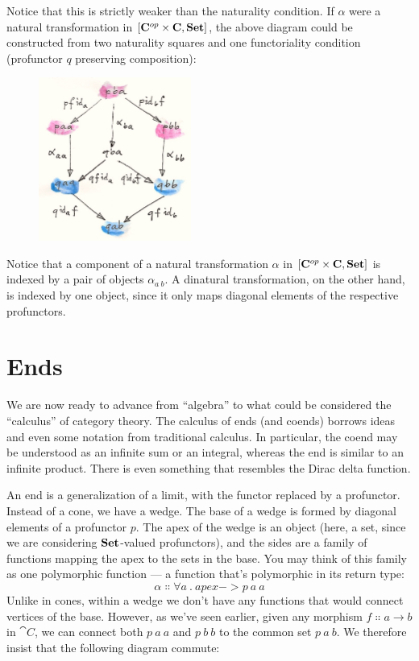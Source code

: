 \noindent
Notice that this is strictly weaker than the naturality condition. If
$\alpha$ were a natural transformation in
${[}\mathbf{C}^{op}\times{}\mathbf{C}, \mathbf{Set}{]}$, the above diagram could be constructed
from two naturality squares and one functoriality condition (profunctor
$q$ preserving composition):

\begin{figure}[H]
\centering
\includegraphics[width=50mm]{images/end-1.jpg}
\end{figure}

\noindent
Notice that a component of a natural transformation $\alpha$ in
${[}\mathbf{C}^{op}\times{}\mathbf{C}, \mathbf{Set}{]}$ is indexed by a pair of objects
$\alpha_{a\ b}$. A dinatural transformation, on the other hand, is
indexed by one object, since it only maps diagonal elements of the
respective profunctors.

\section{Ends}

We are now ready to advance from ``algebra'' to what could be considered
the ``calculus'' of category theory. The calculus of ends (and coends)
borrows ideas and even some notation from traditional calculus. In
particular, the coend may be understood as an infinite sum or an
integral, whereas the end is similar to an infinite product. There is
even something that resembles the Dirac delta function.

An end is a generalization of a limit, with the functor replaced by a
profunctor. Instead of a cone, we have a wedge. The base of a wedge is
formed by diagonal elements of a profunctor $p$. The apex of the
wedge is an object (here, a set, since we are considering
$\mathbf{Set}$-valued profunctors), and the sides are a family of
functions mapping the apex to the sets in the base. You may think of
this family as one polymorphic function --- a function that's
polymorphic in its return type:
\[\alpha \Colon \forall a\ .\ apex -> p\ a\ a\]
Unlike in cones, within a wedge we don't have any functions that would
connect vertices of the base. However, as we've seen earlier, given any
morphism $f \Colon a \to b$ in $\cat{C}$, we can connect both
$p\ a\ a$ and $p\ b\ b$ to the common set
$p\ a\ b$. We therefore insist that the following diagram
commute:


